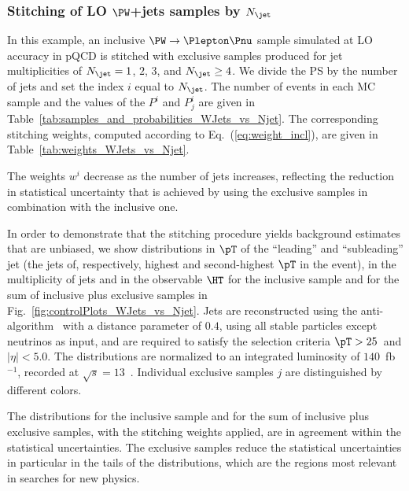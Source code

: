 \subsubsection{Stitching of LO $\PW$+jets samples by $N_{\jet}$}
\label{sec:WJets_vs_Njet}

In this example, an inclusive $\PW \to \Plepton\Pnu$ sample simulated at LO accuracy in pQCD 
is stitched with exclusive samples produced for jet multiplicities of $N_{\jet} = 1$, $2$, $3$, and $N_{\jet} \geq 4$.
We divide the PS by the number of jets and set the index $i$ equal to $N_{\jet}$.
The number of events in each MC sample and the values of the $P^{i}$ and $P_{j}^{i}$ are given in Table~\ref{tab:samples_and_probabilities_WJets_vs_Njet}.
The corresponding stitching weights, computed according to Eq.~(\ref{eq:weight_incl}), are given in Table~\ref{tab:weights_WJets_vs_Njet}.

The weights $w^{i}$ decrease as the number of jets increases, 
reflecting the reduction in statistical uncertainty that is achieved by using the exclusive samples in combination with the inclusive one.

In order to demonstrate that the stitching procedure yields background estimates that are unbiased,
we show distributions in $\pT$ of the ``leading'' and ``subleading'' jet (the jets of, respectively, highest and second-highest $\pT$ in the event),
in the multiplicity of jets and in the observable $\HT$ 
for the inclusive sample and for the sum of inclusive plus exclusive samples in Fig.~\ref{fig:controlPlots_WJets_vs_Njet}.
Jets are reconstructed using the anti-\kt algorithm~\cite{Cacciari:2008gp,Cacciari:2011ma} with a distance parameter of $0.4$,
using all stable particles except neutrinos as input, and are required to satisfy the selection criteria $\pT > 25$~\GeV and $\vert\eta\vert < 5.0$.
The distributions are normalized to an integrated luminosity of $140$~fb$^{-1}$, recorded at $\sqrt{s}=13$~\TeV.
Individual exclusive samples $j$ are distinguished by different colors.

The distributions for the inclusive sample and for the sum of inclusive plus exclusive samples, with the stitching weights applied, are in agreement within the statistical uncertainties.
The exclusive samples reduce the statistical uncertainties in particular in the tails of the distributions,
which are the regions most relevant in searches for new physics.

